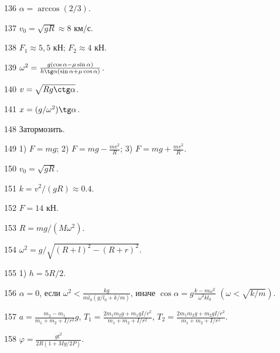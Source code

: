 \begin{Answer}{136}
$\alpha = \arccos(2/3)$.
\end{Answer}
\begin{Answer}{137}
$v_0 = \sqrt{gR} \approx 8$ км/с.
\end{Answer}
\begin{Answer}{138}
$F_1 \approx 5,5$ кН; $F_2 \approx 4$ кН.
\end{Answer}
\begin{Answer}{139}
$\omega^2 = \frac{g(\cos \alpha - \mu \sin \alpha)}{h \tg \alpha (\sin \alpha + \mu \cos \alpha)}$.
\end{Answer}
\begin{Answer}{140}
$v = \sqrt{Rg \ctg \alpha}$.
\end{Answer}
\begin{Answer}{141}
$x = (g/\omega^2) \tg \alpha$.
\end{Answer}
\begin{Answer}{148}
Затормозить.
\end{Answer}
\begin{Answer}{149}
1) $F=mg$; 2) $F=mg-\frac{mv^2}{R}$; 3) $F=mg+\frac{mv^2}{R}$.
\end{Answer}
\begin{Answer}{150}
$v_0 = \sqrt{gR}$.
\end{Answer}
\begin{Answer}{151}
$k=v^2/(gR) \approx 0.4$.
\end{Answer}
\begin{Answer}{152}
$F = 14$ кН.
\end{Answer}
\begin{Answer}{153}
$R = mg/(M\omega^2)$.
\end{Answer}
\begin{Answer}{154}
$\omega^2 = g/\sqrt{(R+l)^2-(R+r)^2}$.
\end{Answer}
\begin{Answer}{155}
1) $h=5R/2$.
\end{Answer}
\begin{Answer}{156}
$\alpha = 0$, если $\omega^2 < \frac{kg}{ml_0(g/l_0 + k/m)}$, иначе $\cos \alpha = g\frac{k-m\omega^2}{\omega^2kl_0}$ $\left( \omega < \sqrt{k/m} \right)$.
\end{Answer}
\begin{Answer}{157}
$a= \frac{m_2-m_1}{m_1+m_2+I/r^2}g$, $T_1 = \frac{2m_1m_2g + m_1gI/r^2}{m_1+m_2+I/r^2}$, $T_2 = \frac{2m_1m_2g + m_2gI/r^2}{m_1+m_2+I/r^2}$.
\end{Answer}
\begin{Answer}{158}
$\varphi = \frac{gt^2}{2R(1+Mg/2P)}$.
\end{Answer}
